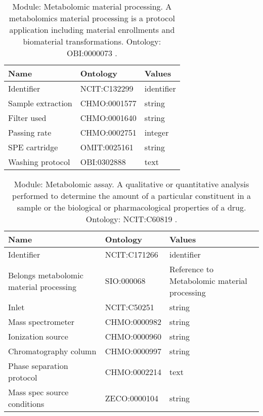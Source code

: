 \documentclass{article}
\begin{document}
\begin{table}[htb]
\begin{tabular}{lll}
Name & Ontology & Values \\
\hline
Identifier & NCIT:C132299  & identifier \\
Sample extraction & CHMO:0001577  & string \\
Filter used & CHMO:0001640  & string \\
Passing rate & CHMO:0002751  & integer \\
SPE cartridge & OMIT:0025161  & string \\
Washing protocol & OBI:0302888  & text \\
\hline
\end{tabular}
\caption[Module: Metabolomic material processing]{\label{table:table16} Module: Metabolomic material processing. A metabolomics material processing is a protocol application including material enrollments and biomaterial transformations. Ontology: OBI:0000073 . }
\end{table}

\begin{table}[htb]
\begin{tabular}{lll}
Name & Ontology & Values \\
\hline
Identifier & NCIT:C171266  & identifier \\
Belongs metabolomic material processing & SIO:000068  & Reference to Metabolomic material processing \\
Inlet & NCIT:C50251  & string \\
Mass spectrometer & CHMO:0000982  & string \\
Ionization source & CHMO:0000960  & string \\
Chromatography column & CHMO:0000997  & string \\
Phase separation protocol & CHMO:0002214  & text \\
Mass spec source conditions & ZECO:0000104  & string \\
\hline
\end{tabular}
\caption[Module: Metabolomic assay]{\label{table:table17} Module: Metabolomic assay. A qualitative or quantitative analysis performed to determine the amount of a particular constituent in a sample or the biological or pharmacological properties of a drug. Ontology: NCIT:C60819 . }
\end{table}
\end{document}
